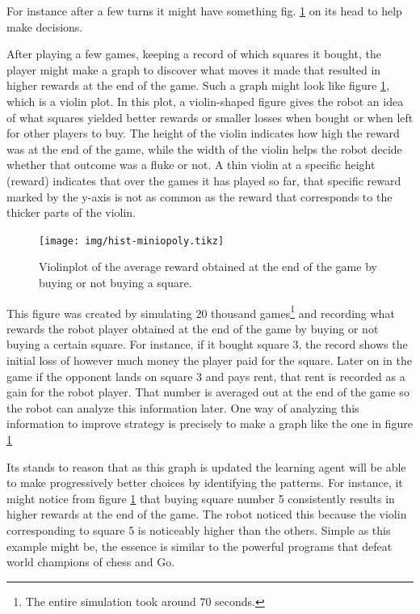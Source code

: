 For instance after a few turns it might have something fig. 
\ref{fig:hist-miniopoly} on its head to help make decisions.

After playing a few games, keeping a record of which squares it 
bought, the player might make a graph to discover what moves it 
made that resulted in higher rewards at the end of the game. 
Such a graph might look like figure \ref{fig:hist-miniopoly}, 
which is a violin plot. In this plot, a violin-shaped figure 
gives the robot an idea of what squares yielded better rewards 
or smaller losses when bought or when left for other players to 
buy. The height of the violin indicates how high the reward was 
at the end of the game, while the width of the violin helps the 
robot decide whether that outcome was a fluke or not. A thin 
violin at a specific height (reward) indicates that over the 
games it has played so far, that specific reward marked by the 
y-axis is not as common as the reward that corresponds to the 
thicker parts of the violin.

\begin{figure}
\centering
\texttt{[image: img/hist-miniopoly.tikz]}
\label{fig:hist-miniopoly}
\caption{Violinplot of the average reward obtained at the end 
of the game by buying or not buying a square.}
\end{figure}

This figure was created by simulating 20 thousand 
games\footnote{The entire simulation took around 70 seconds.} 
and recording what rewards the robot player obtained at the end 
of the game by buying or not buying a certain square. For 
instance, if it bought square 3, the record shows the initial 
loss of however much money the player paid for the square. 
Later on in the game if the opponent lands on square 3 and pays 
rent, that rent is recorded as a gain for the robot player. 
That number is averaged out at the end of the game so the robot 
can analyze this information later. One way of analyzing this 
information to improve strategy is precisely to make a graph 
like the one in figure \ref{fig:hist-miniopoly}

Its stands to reason that as this graph is updated the learning 
agent will be able to make progressively better choices by 
identifying the patterns. For instance, it might notice from 
figure \ref{fig:hist-miniopoly} that buying square number 5 
consistently results in higher rewards at the end of the game. 
The robot noticed this because the violin corresponding to 
square 5 is noticeably higher than the others. Simple as this 
example might be, the essence is similar to the powerful 
programs that defeat world champions of chess and Go.

